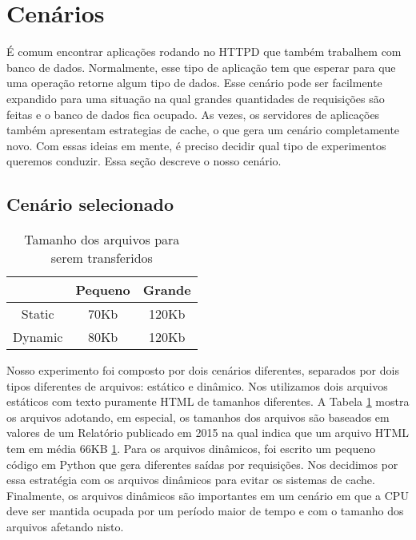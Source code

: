 \section{Cenários}

É comum encontrar aplicações rodando no HTTPD que também trabalhem com banco de
dados. Normalmente, esse tipo de aplicação tem que esperar para que uma
operação retorne algum tipo de dados. Esse cenário pode ser facilmente
expandido para uma situação na qual grandes quantidades de requisições são
feitas e o banco de dados fica ocupado. As vezes, os servidores de aplicações
também apresentam estrategias de cache, o que gera um cenário completamente
novo. Com essas ideias em mente, é preciso decidir qual tipo de experimentos
queremos conduzir. Essa seção descreve o nosso cenário.

\subsection{Cenário selecionado}
\label{sec:scenarios}

\begin{table}[!h]
  \centering
  \begin{tabular}{|c|c|c|}
    \hline
    & \textbf{Pequeno} & \textbf{Grande}\\
    \hline
    Static & 70Kb & 120Kb\\
    \hline
    Dynamic & 80Kb & 120Kb \\
    \hline
  \end{tabular}
  \caption{Tamanho dos arquivos para serem transferidos}
  \label{tab:file_size}
\end{table}

Nosso experimento foi composto por dois cenários diferentes, separados por dois
tipos diferentes de arquivos: estático e dinâmico. Nos utilizamos dois arquivos
estáticos com texto puramente HTML de tamanhos diferentes. A Tabela
\ref{tab:file_size} mostra os arquivos adotando, em especial, os tamanhos dos
arquivos são baseados em valores de um Relatório publicado em 2015 na qual
indica que um arquivo HTML tem em média 66KB \ref{tab:file_size}. Para os
arquivos dinâmicos, foi escrito um pequeno código em Python que gera diferentes
saídas por requisições. Nos decidimos por essa estratégia com os arquivos
dinâmicos para evitar os sistemas de cache. Finalmente, os arquivos dinâmicos
são importantes em um cenário em que a CPU deve ser mantida ocupada por um
período maior de tempo e com o tamanho dos arquivos afetando nisto.


